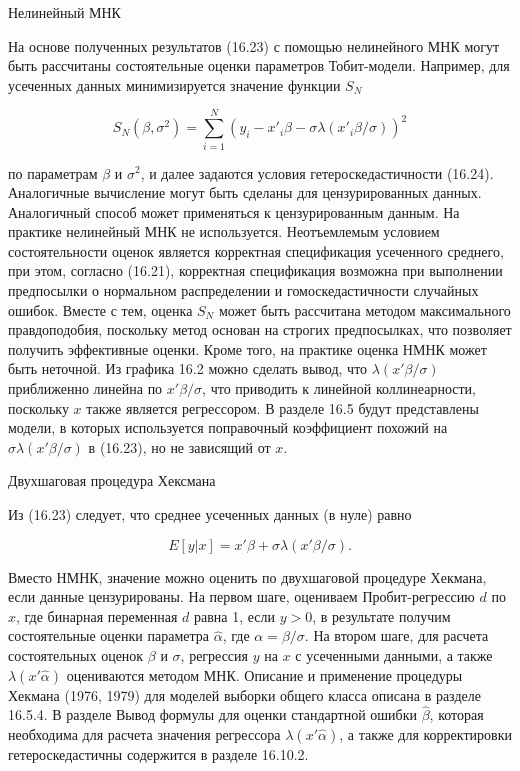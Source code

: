 Нелинейный МНК

На основе полученных результатов (16.23) с помощью нелинейного МНК могут быть рассчитаны состоятельные оценки параметров Тобит-модели. Например, для усеченных данных минимизируется значение функции $S_N$

\[
S_{N}(\beta,\sigma^2)=\sum^N_{i=1}\left(y_{i}-{x'}_{i}{\beta}-{\sigma}{\lambda}({x'}_{i}{\beta}/{\sigma})\right)^2
\]

по параметрам $\beta$ и ${\sigma}^2$, и далее задаются условия гетероскедастичности (16.24). Аналогичные вычисление могут быть сделаны для цензурированных данных. Аналогичный способ может применяться к цензурированным данным.
На практике нелинейный МНК не используется. Неотъемлемым условием состоятельности оценок является корректная спецификация усеченного среднего, при этом, согласно (16.21), корректная спецификация возможна при выполнении предпосылки о нормальном распределении и гомоскедастичности случайных ошибок. Вместе с тем, оценка $S_N$ может быть рассчитана методом максимального правдоподобия, поскольку метод основан на строгих предпосылках, что позволяет получить эффективные оценки. Кроме того, на практике оценка НМНК может быть неточной. Из графика 16.2 можно сделать вывод, что $\lambda(x'\beta/\sigma)$ приближенно линейна по $x'\beta/\sigma$, что приводить к линейной коллинеарности, поскольку $x$ также является регрессором. В разделе 16.5 будут представлены модели, в которых используется поправочный коэффициент похожий на $\sigma\lambda(x'\beta/\sigma)$ в (16.23), но не зависящий от $x$.


Двухшаговая процедура Хексмана

Из (16.23) следует, что среднее усеченных данных (в нуле) равно

\begin{equation}
E[y|x]=x'\beta+\sigma\lambda(x'\beta/\sigma).
\end{equation}

Вместо НМНК, значение можно оценить по двухшаговой процедуре Хекмана, если данные цензурированы. На первом шаге, оцениваем Пробит-регрессию $d$ по $x$, где бинарная переменная $d$ равна 1, если $y>0$, в результате получим состоятельные оценки параметра $\hat{\alpha}$, где $\alpha=\beta/\sigma$. На втором шаге, для расчета состоятельных оценок $\beta$ и $\sigma$, регрессия $y$ на $x$ с усеченными данными, а также $\lambda(x'\hat{\alpha})$ оцениваются методом МНК.
Описание и применение процедуры Хекмана (1976, 1979) для моделей выборки общего класса описана в разделе 16.5.4. В разделе 
Вывод формулы для оценки стандартной ошибки $\hat{\beta}$, которая необходима для расчета значения регрессора $\lambda(x'\hat{\alpha})$, а также для корректировки гетероскедастичны содержится в разделе 16.10.2.

